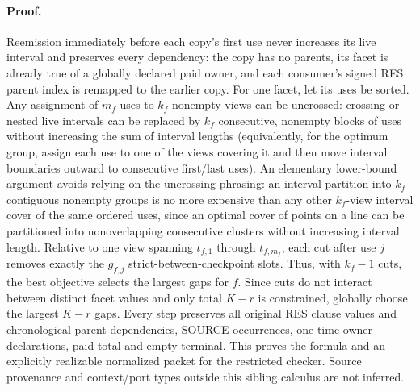 \paragraph{Proof.}
Reemission immediately before each copy's first use never increases its live interval and preserves every dependency: the copy has no parents, its facet is already true of a globally declared paid owner, and each consumer's signed RES parent index is remapped to the earlier copy. For one facet, let its uses be sorted. Any assignment of $m_f$ uses to $k_f$ nonempty views can be uncrossed: crossing or nested live intervals can be replaced by $k_f$ consecutive, nonempty blocks of uses without increasing the sum of interval lengths (equivalently, for the optimum group, assign each use to one of the views covering it and then move interval boundaries outward to consecutive first/last uses). An elementary lower-bound argument avoids relying on the uncrossing phrasing: an interval partition into $k_f$ contiguous nonempty groups is no more expensive than any other $k_f$-view interval cover of the same ordered uses, since an optimal cover of points on a line can be partitioned into nonoverlapping consecutive clusters without increasing interval length. Relative to one view spanning $t_{f,1}$ through $t_{f,m_f}$, each cut after use $j$ removes exactly the $g_{f,j}$ strict-between-checkpoint slots. Thus, with $k_f-1$ cuts, the best objective selects the largest gaps for $f$. Since cuts do not interact between distinct facet values and only total $K-r$ is constrained, globally choose the largest $K-r$ gaps. Every step preserves all original RES clause values and chronological parent dependencies, SOURCE occurrences, one-time owner declarations, paid total and empty terminal. This proves the formula and an explicitly realizable normalized packet for the restricted checker. Source provenance and context/port types outside this sibling calculus are not inferred.

